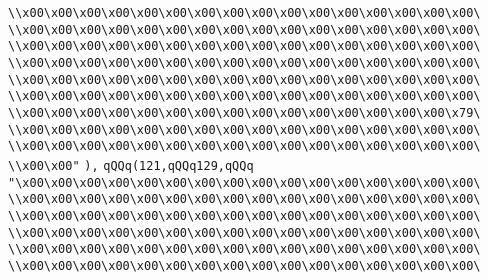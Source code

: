 \verb|\\x00\x00\x00\x00\x00\x00\x00\x00\x00\x00\x00\x00\x00\x00\x00\x00\|\newline
\verb|\\x00\x00\x00\x00\x00\x00\x00\x00\x00\x00\x00\x00\x00\x00\x00\x00\|\newline
\verb|\\x00\x00\x00\x00\x00\x00\x00\x00\x00\x00\x00\x00\x00\x00\x00\x00\|\newline
\verb|\\x00\x00\x00\x00\x00\x00\x00\x00\x00\x00\x00\x00\x00\x00\x00\x00\|\newline
\verb|\\x00\x00\x00\x00\x00\x00\x00\x00\x00\x00\x00\x00\x00\x00\x00\x00\|\newline
\verb|\\x00\x00\x00\x00\x00\x00\x00\x00\x00\x00\x00\x00\x00\x00\x00\x00\|\newline
\verb|\\x00\x00\x00\x00\x00\x00\x00\x00\x00\x00\x00\x00\x00\x00\x00\x79\|\newline
\verb|\\x00\x00\x00\x00\x00\x00\x00\x00\x00\x00\x00\x00\x00\x00\x00\x00\|\newline
\verb|\\x00\x00\x00\x00\x00\x00\x00\x00\x00\x00\x00\x00\x00\x00\x00\x00\|\newline
\verb|\\x00\x00"|\newline
\verb|),|\newline
\verb|qQQq(121,qQQq129,qQQq|\newline
\verb|"\x00\x00\x00\x00\x00\x00\x00\x00\x00\x00\x00\x00\x00\x00\x00\x00\|\newline
\verb|\\x00\x00\x00\x00\x00\x00\x00\x00\x00\x00\x00\x00\x00\x00\x00\x00\|\newline
\verb|\\x00\x00\x00\x00\x00\x00\x00\x00\x00\x00\x00\x00\x00\x00\x00\x00\|\newline
\verb|\\x00\x00\x00\x00\x00\x00\x00\x00\x00\x00\x00\x00\x00\x00\x00\x00\|\newline
\verb|\\x00\x00\x00\x00\x00\x00\x00\x00\x00\x00\x00\x00\x00\x00\x00\x00\|\newline
\verb|\\x00\x00\x00\x00\x00\x00\x00\x00\x00\x00\x00\x00\x00\x00\x00\x00\|\newline
